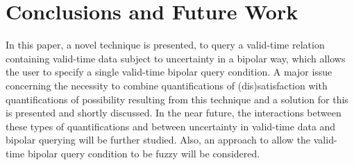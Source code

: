\documentclass[runningheads,a4paper]{llncs}
\begin{document}
\section{Conclusions and Future Work\label{sec:conclusions}}
In this paper, a novel technique is presented, to query a valid-time relation containing valid-time data subject to uncertainty in a bipolar way, which allows the user to specify a single valid-time bipolar query condition. A major issue concerning the necessity to combine quantifications of (dis)satisfaction with quantifications of possibility resulting from this technique and a solution for this is presented and shortly discussed. In the near future, the interactions between these types of quantifications and between uncertainty in valid-time data and bipolar querying will be further studied. Also, an approach to allow the valid-time bipolar query condition to be fuzzy will be considered.



\end{document}
